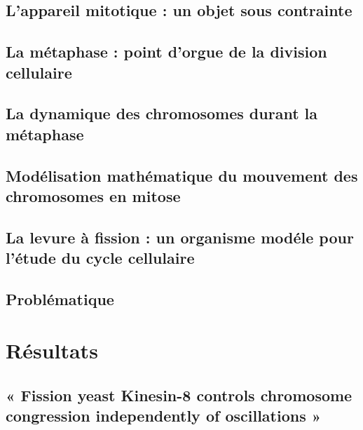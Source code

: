 \documentclass[12pt,a4paper,twoside,openright]{book}
\begin{document}
\section{L'appareil mitotique : un objet sous
contrainte}\label{lappareil-mitotique-un-objet-sous-contrainte}

\section{La métaphase : point d'orgue de la division
cellulaire}\label{la-muxe9taphase-point-dorgue-de-la-division-cellulaire}

\section{La dynamique des chromosomes durant la
métaphase}\label{la-dynamique-des-chromosomes-durant-la-muxe9taphase}

\section{Modélisation mathématique du mouvement des chromosomes en
mitose}\label{moduxe9lisation-mathuxe9matique-du-mouvement-des-chromosomes-en-mitose}

\section{La levure à fission : un organisme modéle pour l'étude du cycle
cellulaire}\label{la-levure-uxe0-fission-un-organisme-moduxe9le-pour-luxe9tude-du-cycle-cellulaire}

\section{Problématique}\label{probluxe9matique}

\chapter{Résultats}\label{ruxe9sultats}

\section{« Fission yeast Kinesin-8 controls chromosome congression
independently of oscillations
»}\label{fission-yeast-kinesin-8-controls-chromosome-congression-independently-of-oscillations}


\end{document}
